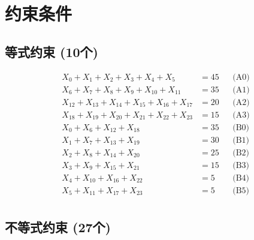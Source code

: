\documentclass[a4paper,10pt]{article}
\begin{document}
\section{约束条件}

\subsection{等式约束 (10个)}

\allowdisplaybreaks
{\small
\begin{align}
X_{0} + X_{1} + X_{2} + X_{3} + X_{4} + X_{5} &= 45 && \text{(A0)} \\
X_{6} + X_{7} + X_{8} + X_{9} + X_{10} + X_{11} &= 35 && \text{(A1)} \\
X_{12} + X_{13} + X_{14} + X_{15} + X_{16} + X_{17} &= 20 && \text{(A2)} \\
X_{18} + X_{19} + X_{20} + X_{21} + X_{22} + X_{23} &= 15 && \text{(A3)} \\
X_{0} + X_{6} + X_{12} + X_{18} &= 35 && \text{(B0)} \\
\allowbreak
X_{1} + X_{7} + X_{13} + X_{19} &= 30 && \text{(B1)} \\
X_{2} + X_{8} + X_{14} + X_{20} &= 25 && \text{(B2)} \\
X_{3} + X_{9} + X_{15} + X_{21} &= 15 && \text{(B3)} \\
X_{4} + X_{10} + X_{16} + X_{22} &= 5 && \text{(B4)} \\
X_{5} + X_{11} + X_{17} + X_{23} &= 5 && \text{(B5)} \\
\end{align}
}

\subsection{不等式约束 (27个)}
\end{document}
